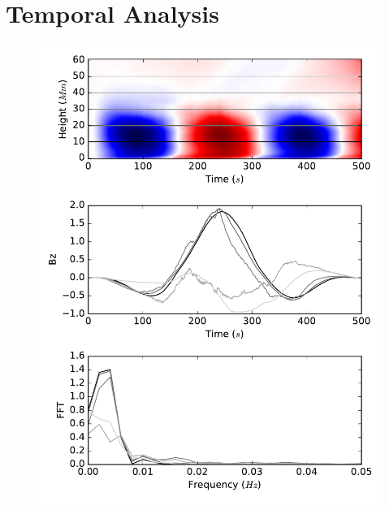 \documentclass{aastex62}
\begin{document}


\section{Temporal Analysis}




\begin{figure}
    \label{fft_sim}
    \includegraphics[scale=0.6]{imrescale/fft_sim.pdf}
    \caption{}
\end{figure}
\end{document}
